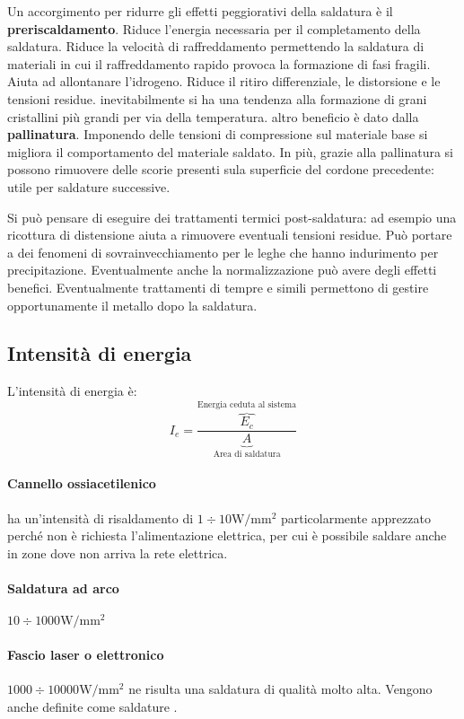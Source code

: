 Un accorgimento per ridurre gli effetti peggiorativi della saldatura è il \textbf{preriscaldamento}.
Riduce l'energia necessaria per il completamento della saldatura.
Riduce la velocità di raffreddamento permettendo la saldatura di materiali in cui il raffreddamento rapido provoca la formazione di fasi fragili.
Aiuta ad allontanare l'idrogeno.
Riduce il ritiro differenziale, le distorsione e le tensioni residue.
inevitabilmente si ha una tendenza alla formazione di grani cristallini più grandi per via della temperatura.
altro beneficio è dato dalla \textbf{pallinatura}.
Imponendo delle tensioni di compressione sul materiale base si migliora il comportamento del materiale saldato.
In più, grazie alla pallinatura si possono rimuovere delle scorie presenti sula superficie del cordone precedente: utile per saldature successive.

Si può pensare di eseguire dei trattamenti termici post-saldatura: ad esempio una ricottura di distensione aiuta a rimuovere eventuali tensioni residue. Può portare a dei fenomeni di sovrainvecchiamento per le leghe che hanno indurimento per precipitazione.
Eventualmente anche la normalizzazione può avere degli effetti benefici.
Eventualmente trattamenti di tempre e simili permettono di gestire opportunamente il metallo dopo la saldatura.

\subsection{Intensità di energia}
L'intensità di energia è:
\begin{equation}
I_e = \frac{\overbrace{E_c}^{\text{Energia ceduta al sistema}}}{\underbrace{A}_{\text{Area di saldatura}}}
\end{equation}

\paragraph{Cannello ossiacetilenico} ha un'intensità di risaldamento di $1 \div 10 \unit{\W/\mm^2}$ particolarmente apprezzato perché non è richiesta l'alimentazione elettrica, per cui è possibile saldare anche in zone dove non arriva la rete elettrica.
\paragraph{Saldatura ad arco} $10 \div 1000 \unit{\W/\mm^2}$  
\paragraph{Fascio laser o elettronico} $1000 \div 10000 \unit{\W/\mm^2}$ ne risulta una saldatura di qualità molto alta. Vengono anche definite come saldature .

